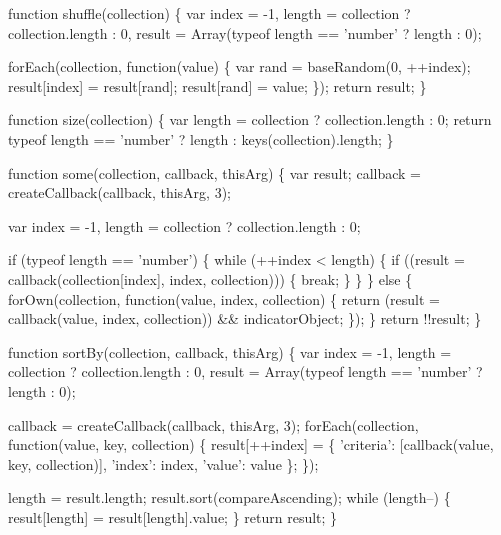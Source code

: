 \begin{DoxyCodeInclude}
{{  \textcolor{keyword}{function} shuffle(collection) \{
    var index = -1,
        length = collection ? collection.length : 0,
        result = Array(typeof length == \textcolor{stringliteral}{'number'} ? length : 0);

    forEach(collection, \textcolor{keyword}{function}(value) \{
      var rand = baseRandom(0, ++index);
      result[index] = result[rand];
      result[rand] = value;
    \});
    \textcolor{keywordflow}{return} result;
  \}

  \textcolor{keyword}{function} size(collection) \{
    var length = collection ? collection.length : 0;
    \textcolor{keywordflow}{return} typeof length == \textcolor{stringliteral}{'number'} ? length : keys(collection).length;
  \}

  \textcolor{keyword}{function} some(collection, callback, thisArg) \{
    var result;
    callback = createCallback(callback, thisArg, 3);

    var index = -1,
        length = collection ? collection.length : 0;

    \textcolor{keywordflow}{if} (typeof length == \textcolor{stringliteral}{'number'}) \{
      \textcolor{keywordflow}{while} (++index < length) \{
        \textcolor{keywordflow}{if} ((result = callback(collection[index], index, collection))) \{
          \textcolor{keywordflow}{break};
        \}
      \}
    \} \textcolor{keywordflow}{else} \{
      forOwn(collection, \textcolor{keyword}{function}(value, index, collection) \{
        \textcolor{keywordflow}{return} (result = callback(value, index, collection)) && indicatorObject;
      \});
    \}
    \textcolor{keywordflow}{return} !!result;
  \}

  \textcolor{keyword}{function} sortBy(collection, callback, thisArg) \{
    var index = -1,
        length = collection ? collection.length : 0,
        result = Array(typeof length == \textcolor{stringliteral}{'number'} ? length : 0);

    callback = createCallback(callback, thisArg, 3);
    forEach(collection, \textcolor{keyword}{function}(value, key, collection) \{
      result[++index] = \{
        \textcolor{stringliteral}{'criteria'}: [callback(value, key, collection)],
        \textcolor{stringliteral}{'index'}: index,
        \textcolor{stringliteral}{'value'}: value
      \};
    \});

    length = result.length;
    result.sort(compareAscending);
    \textcolor{keywordflow}{while} (length--) \{
      result[length] = result[length].value;
    \}
    \textcolor{keywordflow}{return} result;
  \}

}}
\end{DoxyCodeInclude}
